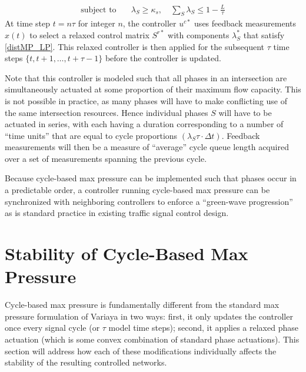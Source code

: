 \begin{align*}
\text{subject to} &\quad  \lambda_{S} \geq \kappa_s, \quad \sum_{S} \lambda_{S} \leq 1 - \tfrac{L}{\tau} 
\end{align*}
At time step $t=n\tau$ for integer $n$, the controller $u^{c*}$ uses feedback measurements $x(t)$ to select a relaxed control matrix $S^{r*}$ with components $\lambda_S^*$ that satisfy \eqref{distMP_LP}. This relaxed controller is then applied for the subsequent $\tau$ time steps $\{t, t+1, \ldots, t+\tau-1\}$ before the controller is updated. 

Note that this controller is modeled such that all phases in an intersection are simultaneously actuated at some proportion of their maximum flow capacity. This is not possible in practice, as many phases will have to make conflicting use of the same intersection resources. Hence individual phases $S$ will have to be actuated in series, with each having a duration corresponding to a number of ``time units'' that are equal to cycle proportions $(\lambda_S \tau\cdot  \Delta t)$. Feedback measurements will then be a measure of ``average'' cycle queue length acquired over a set of measurements spanning the previous cycle.  

Because cycle-based max pressure can be implemented such that phases occur in a predictable order, a controller running cycle-based max pressure can be synchronized with neighboring controllers to enforce a ``green-wave progression'' as is standard practice in existing traffic signal control design. 

\section{Stability of Cycle-Based Max Pressure}
Cycle-based max pressure is fundamentally different from the standard max pressure formulation of Variaya \cite{MaxPressureStochastic} in two ways: first, it only updates the controller once every signal cycle (or $\tau$ model time steps); second, it applies a relaxed phase actuation (which is some convex combination of standard phase actuations). This section will address how each of these modifications individually affects the stability of the resulting controlled networks. 

